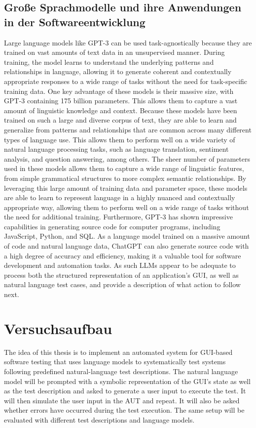 \section{Große Sprachmodelle und ihre Anwendungen in der Softwareentwicklung}
\label{subsec:Foundations:LLM}

Large language models like GPT-3 can be used task-agnostically because they are trained on vast amounts of text data in an unsupervised manner. During training, the model learns to understand the underlying patterns and relationships in language, allowing it to generate coherent and contextually appropriate responses to a wide range of tasks without the need for task-specific training data.
One key advantage of these models is their massive size, with GPT-3 containing 175 billion parameters.
This allows them to capture a vast amount of linguistic knowledge and context.
Because these models have been trained on such a large and diverse corpus of text, they are able to learn and generalize from patterns and relationships that are common across many different types of language use. This allows them to perform well on a wide variety of natural language processing tasks, such as language translation, sentiment analysis, and question answering, among others.
The sheer number of parameters used in these models allows them to capture a wide range of linguistic features, from simple grammatical structures to more complex semantic relationships. By leveraging this large amount of training data and parameter space, these models are able to learn to represent language in a highly nuanced and contextually appropriate way, allowing them to perform well on a wide range of tasks without the need for additional training.
Furthermore, GPT-3 has shown impressive capabilities in generating source code for computer programs, including JavaScript, Python, and SQL. As a language model trained on a massive amount of code and natural language data, ChatGPT can also generate source code with a high degree of accuracy and efficiency, making it a valuable tool for software development and automation tasks.
As such LLMs appear to be adequate to process both the structured representation of an application’s GUI, as well as natural language test cases, and provide a description of what action to follow next.


\chapter{Versuchsaufbau}

The idea of this thesis is to implement an automated system for GUI-based software testing that uses language models to systematically test systems following predefined natural-language test descriptions.
The natural language model will be prompted with a symbolic representation of the GUI’s state as well as the test description and asked to generate a user input to execute the test.
It will then simulate the user input in the AUT and repeat.
It will also be asked whether errors have occurred during the test execution.
The same setup will be evaluated with different test descriptions and language models.

